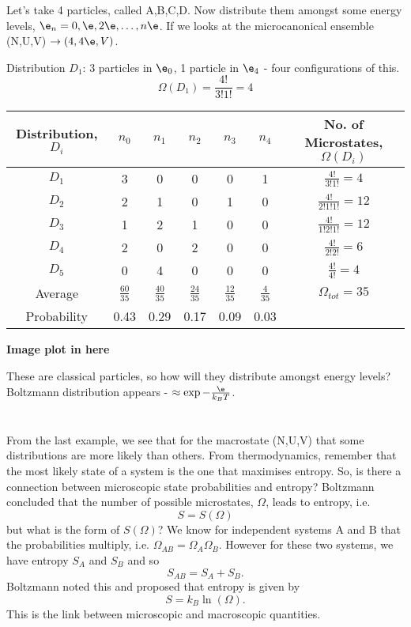 \documentclass[a4paper, 11pt, normalem]{report}
\begin{document}
\begin{example}
Let's take 4 particles, called A,B,C,D.
Now distribute them amongst some energy levels, $\e_n = 0, \e, 2\e, \dots, n\e$.
If we looks at the microcanonical ensemble (N,U,V) $\to (4,4\e,V)$.

Distribution $D_1$: 3 particles in $\e_0$, 1 particle in $\e_4$ - four configurations of this.
\begin{equation}
    \Omega(D_1) = \frac{4!}{3!1!} = 4
\end{equation}
\begin{table}[H]
\centering
\begin{tabular}{|c||c|c|c|c|c||c|}
    \hline
    Distribution, $D_i$ & $n_0$ & $n_1$ & $n_2$ & $n_3$ & $n_4$ & No. of Microstates, $\Omega(D_i)$ \\
    \hline
    $D_1$ & 3 & 0 & 0 & 0 & 1 & $\frac{4!}{3!1!} = 4$ \\
    $D_2$ & 2 & 1 & 0 & 1 & 0 & $\frac{4!}{2!1!1!} = 12$ \\
    $D_3$ & 1 & 2 & 1 & 0 & 0 & $\frac{4!}{1!2!1!} = 12$ \\
    $D_4$ & 2 & 0 & 2 & 0 & 0 & $\frac{4!}{2!2!} = 6$ \\
    $D_5$ & 0 & 4 & 0 & 0 & 0 & $\frac{4!}{4!} = 4$ \\
    \hline
    Average & $\frac{60}{35}$ & $\frac{40}{35}$ & $\frac{24}{35}$ & $\frac{12}{35}$ & $\frac{4}{35}$ & $\Omega_{tot} = 35$ \\
    \hline
    Probability & 0.43 & 0.29 & 0.17 & 0.09 & 0.03 & \\
    \hline
\end{tabular}
\end{table}
\textbf{Image plot in here}

These are classical particles, so how will they distribute amongst energy levels? Boltzmann distribution appears - $\approx \exp{-\frac{\e}{k_BT}}$.
\end{example}

\chapter{}
From the last example, we see that for the macrostate (N,U,V) that some distributions are more likely than others.
From thermodynamics, remember that the most likely state of a system is the one that maximises entropy.
So, is there a connection between microscopic state probabilities and entropy?
Boltzmann concluded that the number of possible microstates, $\Omega$, leads to entropy, i.e.
\begin{equation}
    S = S(\Omega)
\end{equation}
but what is the form of $S(\Omega)$?
We know for independent systems A and B that the probabilities multiply, i.e. $\Omega_{AB} = \Omega_A\Omega_B$.
However for these two systems, we have entropy $S_A$ and $S_B$ and so
\begin{equation}
    S_{AB} = S_A + S_B.
\end{equation}
Boltzmann noted this and proposed that entropy is given by
\begin{equation}
    S = k_B\ln(\Omega).
\end{equation}
This is the link between microscopic and macroscopic quantities.
\end{document}

